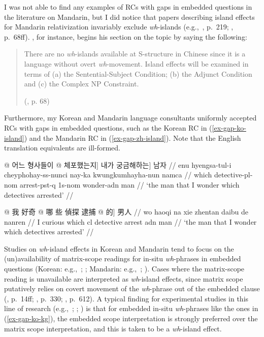 I was not able to find any examples of RCs with gaps in embedded questions in the literature on Mandarin, but I did notice that papers describing island effects for Mandarin relativization invariably exclude \textit{wh}-islands (e.g.,~\cite{huang.etal2009}, p.~219; \cite{ning1993}, p.~68ff). \textcite{ning1993}, for instance, begins his section on the topic by saying the following:

\begin{quote}
There are no \textit{wh}-islands available at S-structure in Chinese since it is a language without overt \textit{wh}-movement. Island effects will be examined in terms of (a) the Sentential-Subject Condition; (b) the Adjunct Condition and (c) the Complex NP Constraint. \par\nobreak\vspace{5pt}
\hfill (\cite{ning1993}, p. 68)
\end{quote}
\vspace{-12pt}

Furthermore, my Korean and Mandarin language consultants uniformly accepted RCs with gaps in embedded questions, such as the Korean RC in (\ref{ex-gap-ko-island}) and the Mandarin RC in (\ref{ex-gap-zh-island}). Note that the English translation equivalents are ill-formed.

\ex 
\begingl[everygla = \ko]\label{ex-gap-ko-island}
\gla \nogloss{[[} @ 어느 형사들이 \nogloss{\_\_ } @  체포했는지] 내가 궁금해하는] 남자 //
\glb enu hyengsa-tul-i cheyphohay-ss-nunci nay-ka kwungkumhayha-nun namca //
\glc which detective-{\sc pl-nom} arrest-{\sc pst-q} {\sc 1s-nom} wonder-{\sc adn} man //
\glft *`the man that I wonder which detectives arrested' //
\endgl
\xe 

\ex 
\begingl[everygla = \zh]\label{ex-gap-zh-island}
\gla \nogloss{[} @ 我 好奇 \nogloss{[} @ 哪 些 偵探 逮捕 \nogloss{\_\_] } @  的] 男人 //
\glb wo haoqi na xie zhentan daibu de nanren //
\glc I curious which {\sc cl} detective arrest {\sc adn} man //
\glft *`the man that I wonder which detectives arrested' //
\endgl
\xe 

\noindent Studies on \textit{wh}-island effects in Korean and Mandarin tend to focus on the (un)availability of matrix-scope readings for in-situ \textit{wh}-phrases in embedded questions (Korean: e.g.,~\cite{cho2017}; \cite{kim.goodall2016}; Mandarin: e.g.,~\cite{chen2024}; \cite{huang1982}). Cases where the matrix-scope reading is unavailable are interpreted as \textit{wh}-island effects, since matrix scope putatively relies on covert movement of the \textit{wh}-phrase out of the embedded clause (\cite{chen2024}, p.~14ff; \cite{cho2017}, p.~330; \cite{lu.etal2020}, p.~612). A typical finding for experimental studies in this line of research (e.g.,~\cite{chen2024}; \cite{cho2017}; \cite{kim.goodall2016}) is that for embedded in-situ \textit{wh}-phrases like the ones in (\ref{ex-gap-ko-kg}), the embedded scope interpretation is strongly preferred over the matrix scope interpretation, and this is taken to be a \textit{wh}-island effect.

